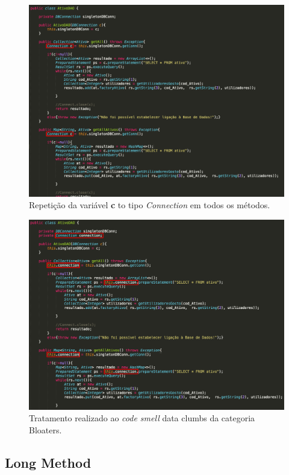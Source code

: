 \begin{figure}[H]
	\centering
	\includegraphics[scale=0.35]{images/bloaters/data-clumps/b1-1.png}
	\caption{Repetição da variável \textbf{c} to tipo \emph{Connection} em todos os métodos.}
	\label{img:data-cumpls-1}
\end{figure}

\begin{figure}[H]
	\centering
	\includegraphics[scale=0.35]{images/bloaters/data-clumps/b1-2.png}
	\caption{Tratamento realizado ao \emph{code smell} data clumbs da categoria Bloaters.}
	\label{img:data-cumpls-2}
\end{figure}

\subsection{Long Method}

